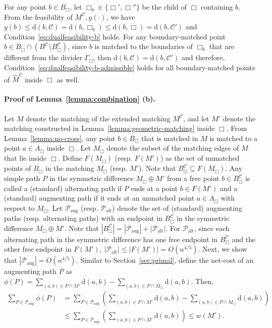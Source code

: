 \documentclass[11pt,onecolumn]{article}
\def\mcC{{\mathcal{C}}}
\def\mcP{{\mathcal{P}}}
\newcommand{\cell}{\Box}
\newcommand{\distancetocell}[2]{\mathrm{d}(#1, #2)}
\newcommand{\distance}[2]{\mathrm{d}(#1, #2)}
\newcommand\myparagraph[1]{\paragraph{#1}}
\begin{document}
For any point $b\in B_\cell$, let $\cell_b\in\{\cell', \cell''\}$ be the child of $\cell$ containing $b$. From the feasibility of $M^\mcC, y(\cdot)$, we have $y(b)\le \distancetocell{b}{\mcC}=\distancetocell{b}{\cell_b} \le \distancetocell{b}{\cell}=\distancetocell{b}{\mcC'}$ and Condition~\eqref{eq:dualfeasibility-b} holds. For any boundary-matched point $b\in B_\cell \cap (B^\mcC\setminus B_\cell^\mcC)$, since $b$ is matched to the boundaries of $\cell_b$ that are different from the divider $\Gamma_\cell$, then $\distance{b}{\mcC}=\distance{b}{\mcC'}$ and therefore, Condition~\eqref{eq:dualfeasibility-b-admissible} holds for all boundary-matched points of $\hat{M}^\mcC$ inside $\cell$ as well.



\myparagraph{Proof of Lemma~\ref{lemma:combination} (b).} Let $M$ denote the matching of the extended matching $M^\mcC$, and let $M'$ denote the matching constructed in Lemma~\ref{lemma:geometric-matching} inside $\cell$. From Lemma~\ref{lemma:no-cross}, any point $b\in B_\cell$ that is matched in $M$ is matched to a point $a\in A_\cell$ inside $\cell$. Let $M_\cell$ denote the subset of the matching edges of $M$ that lie inside $\cell$. Define $F(M_\cell)$ (resp. $F(M')$) as the set of unmatched points of $B_\cell$ in the matching $M_\cell$ (resp. $M'$). Note that $B_\cell^\mcC\subseteq F(M_\cell)$. Any simple path $P$ in the symmetric difference $M_\cell\oplus M'$ from a free point $b\in B_\cell^\mcC$ is called a (standard) alternating path if $P$ ends at a point $b\in F(M')$ and a (standard) augmenting path if it ends at an unmatched point $a\in A_\cell$ with respect to $M_\cell$.  Let $\mcP_{\mathrm{aug}}$ (resp. $\mcP_{\mathrm{alt}}$) denote the set of (standard) augmenting paths (resp. alternating paths) with an endpoint in $B_\cell^\mcC$ in the symmetric difference $M_\cell\oplus M'$. Note that $|B_\cell^\mcC|=|\mcP_{\mathrm{aug}}| + |\mcP_{\mathrm{alt}}|$. For $\mcP_{\mathrm{alt}}$, since each alternating path in the symmetric difference has one free endpoint in $B_\cell^\mcC$ and the other free endpoint in $F(M')$, $|\mcP_{\mathrm{alt}}|\le |F(M')|=O(n^{4/5})$. 
Next, we show that $|\mcP_{\mathrm{aug}}|=O(n^{4/5})$.
Similar to Section~\ref{sec:primal}, define the net-cost of an augmenting path $P$ as $\phi(P) = \sum_{(a,b)\in P\cap M'}\distance{a}{b} - \sum_{(a,b)\in P\cap M_\cell}\distance{a}{b}$. Then,
\begin{align}
    \sum_{P\in \mcP_{\mathrm{aug}}} \phi(P) &= \sum_{P\in \mcP_{\mathrm{aug}}} \left(\sum_{(a,b)\in P\cap M'}\distance{a}{b} - \sum_{(a,b)\in P\cap M_\cell}\distance{a}{b} \right)\nonumber\\ &\le \sum_{P\in \mcP_{\mathrm{aug}}} \left(\sum_{(a,b)\in P\cap M'}\distance{a}{b}\right)\le w(M').\label{eq:net-cost-sum-1}
\end{align}
\end{document}
